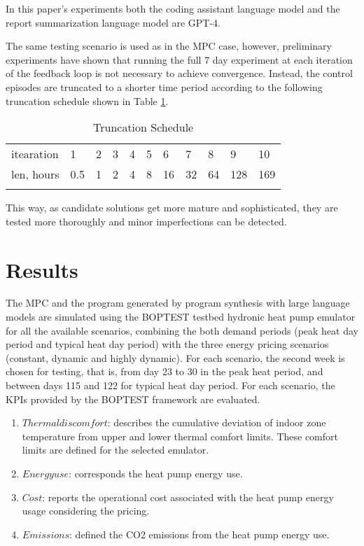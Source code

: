 In this paper’s experiments both the coding assistant language model and the report summarization language model are GPT-4.

The same testing scenario is used as in the MPC case, however, preliminary experiments have shown that running the full 7 day experiment at each iteration of the feedback loop is not necessary to achieve convergence. Instead, the control episodes are truncated to a shorter time period according to the following truncation schedule shown in Table \ref{tab:1}.

\begin{table}
\caption{Truncation Schedule}
\label{tab:1}       %
\begin{tabular}{lllllllllll}
\hline\noalign{\smallskip}
itearation & 1 & 2 & 3 & 4 & 5 & 6 & 7 & 8 & 9 & 10 \\
\noalign{\smallskip}\hline\noalign{\smallskip}
len, hours & 0.5 & 1 & 2 & 4 & 8 & 16 & 32 & 64 & 128 & 169 \\
\noalign{\smallskip}\hline
\end{tabular}
\end{table}

This way, as candidate solutions get more mature and sophisticated, they are tested more thoroughly and minor imperfections can be detected.

\section{Results}
\label{sec:results}
The MPC and the program generated by program synthesis with large language models are simulated using the BOPTEST testbed hydronic heat pump emulator for all the available scenarios, combining the both demand periods (peak heat day period and typical heat day period) with the three energy pricing scenarios (constant, dynamic and highly dynamic). For each scenario, the second week is chosen for testing, that is, from day 23 to 30 in the peak heat period, and between days 115 and 122 for typical heat day period.
For each scenario, the KPIs provided by the BOPTEST framework are evaluated.
 \begin{enumerate}
     \item $Thermal discomfort$: describes the cumulative deviation of indoor zone temperature from upper and lower thermal comfort limits. These comfort limits are defined for the selected emulator.
     \item $Energy use$: corresponds the heat pump energy use.
     \item $Cost$: reports the operational cost associated with the heat pump energy usage considering the pricing.
     \item $Emissions$: defined the CO2 emissions from the heat pump energy use.
 \end{enumerate}
 
